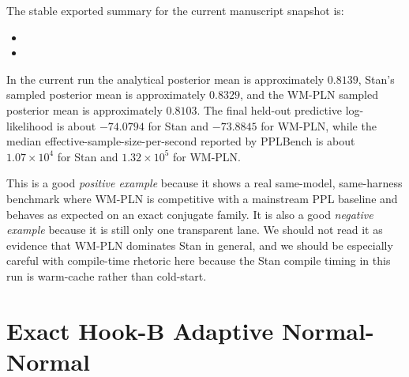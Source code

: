 \documentclass[11pt,openany]{report}
\begin{document}
The stable exported summary for the current manuscript snapshot is:
\begin{itemize}
\item {}
\item {}
\end{itemize}

\begin{table}[htbp]
\centering
\caption{Direct Normal-Normal comparison on the proper PPLBench
harness. On this exact conjugate case, the refreshed WM-PLN lane is slightly
closer to the analytical posterior mean and slightly better on held-out
predictive log-likelihood in the recorded run.}
\label{tab:pplbench-stan-vs-pln}
\end{table}

In the current run the analytical posterior mean is approximately
$0.8139$, Stan's sampled posterior mean is approximately $0.8329$, and the
WM-PLN sampled posterior mean is approximately $0.8103$.  The final held-out
predictive log-likelihood is about $-74.0794$ for Stan and $-73.8845$ for
WM-PLN, while the median effective-sample-size-per-second reported by
PPLBench is about $1.07\times 10^4$ for Stan and $1.32\times 10^5$ for
WM-PLN.

This is a good \emph{positive example} because it shows a real same-model,
same-harness benchmark where WM-PLN is competitive with a mainstream PPL
baseline and behaves as expected on an exact conjugate family.  It is also
a good \emph{negative example} because it is still only one transparent lane.
We should not read it as evidence that WM-PLN dominates Stan in general, and
we should be especially careful with compile-time rhetoric here because the
Stan compile timing in this run is warm-cache rather than cold-start.

\section{Exact Hook-B Adaptive Normal-Normal}
\label{app:pplbench-hookb-normal}
\end{document}
